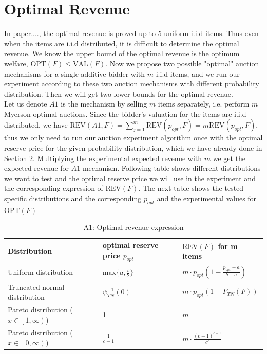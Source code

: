 \section{Optimal Revenue} \label{sec:multiOR}
In paper...., the optimal revenue is proved up to 5 uniform i.i.d items. Thus even when the items are i.i.d distributed, it is difficult to determine the optimal revenue. We know the upper bound of the optimal revenue is the optimum welfare, $\text{OPT}(F) \leqslant \text{VAL}(F)$. Now we propose two possible "optimal" auction mechanisms for a single additive bidder with $m$ i.i.d items, and we run our experiment according to these two auction mechanisms with different probability distribution. Then we will get two lower bounds for the optimal revenue.\\
Let us denote $A1$ is the mechanism by selling $m$ items separately, i.e. perform $m$ Myerson optimal auctions. Since the bidder's valuation for the items are i.i.d distributed, we have $\text{REV}(A1, F) = \sum^m_{j=1} \text{REV}(p_{opt}, F) = m\text{REV}(p_{opt}, F)$, thus we only need to run our auction experiment algorithm once with the optimal reserve price for the given probability distribution, which we have already done in Section 2. Multiplying the experimental expected revenue with $m$ we get the expected revenue for $A1$ mechanism. Following table shows different distributions we want to test and the optimal reserve price we will use in the experiment and the corresponding expression of $\text{REV}(F)$. The next table shows the tested specific distributions and the corresponding $p_{opt}$ and the experimental values for $\text{OPT}(F)$
\begin{center}
	\begin{table}[H]
		\begin{tabular}{ | m{5cm} | m{4cm} |m{4cm}|  } 
		\hline
		\textbf{Distribution}	&	\textbf{optimal reserve price $p_{opt}$}  & 	\textbf{$\text{REV}(F)$ for m items}   \\ 
		\hline
		Uniform distribution & $\text{max} \{a, \frac{b}{2} \}$ & $m \cdot p_{opt} (1-\frac {p_{opt}-a}{b-a})$  \\ 
		\hline
		Truncated normal distribution & $ \psi_{TN}^{-1}(0)$ & $ m \cdot p_{opt} (1-F_{TN}(F))$ \\ 
		\hline
		 Pareto distribution  ($x \in \left[1,\infty \right)$)& 1 & $m$ \\
		\hline
		 Pareto distribution  ($x \in \left[0,\infty \right)$)& $\frac{1}{c-1}$ & $m \cdot \frac{(c-1)^{c-1}}{c^c}$ \\
		\hline
		\end{tabular}
		\caption{A1: Optimal revenue expression}
		\label{tab:optrevenueEx}
	\end{table}
\end{center}
